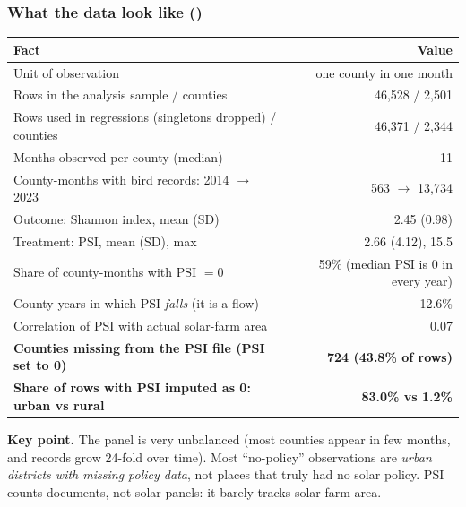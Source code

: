 \documentclass[11pt]{article}
\begin{document}
\subsubsection*{What the data look like ()}
\begin{table}[H]\centering\small
\begin{tabularx}{\linewidth}{>{\raggedright\arraybackslash}Xr}
\toprule
Fact & Value\\
\midrule
Unit of observation & one county in one month\\
Rows in the analysis sample / counties & 46,528 / 2,501\\
Rows used in regressions (singletons dropped) / counties & 46,371 / 2,344\\
Months observed per county (median) & 11\\
County-months with bird records: 2014 $\to$ 2023 & 563 $\to$ 13,734\\
Outcome: Shannon index, mean (SD) & 2.45 (0.98)\\
Treatment: PSI, mean (SD), max & 2.66 (4.12), 15.5\\
Share of county-months with PSI $=0$ & 59\% (median PSI is 0 in every year)\\
County-years in which PSI \emph{falls} (it is a flow) & 12.6\%\\
Correlation of PSI with actual solar-farm area & 0.07\\
\textbf{Counties missing from the PSI file (PSI set to 0)} & \textbf{724 (43.8\% of rows)}\\
\textbf{Share of rows with PSI imputed as 0: urban vs rural} & \textbf{83.0\% vs 1.2\%}\\
\bottomrule
\end{tabularx}
\end{table}
\begin{whybox}\small
\textbf{Key point.} The panel is very unbalanced (most counties appear in few months, and records grow 24-fold over time). Most ``no-policy'' observations are \emph{urban districts with missing policy data}, not places that truly had no solar policy. PSI counts documents, not solar panels: it barely tracks solar-farm area.
\end{whybox}

\end{document}
